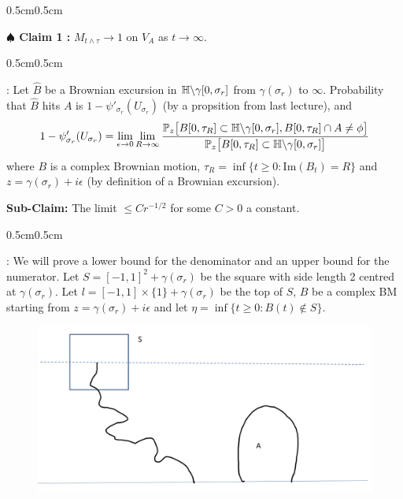 \documentclass[12pt,a4paper]{article}
\newenvironment{proof}
{\begin{changemargin}{0.5cm}{0.5cm} 
	}%
	{\end{changemargin}
}
\newenvironment{subproof}
{\begin{changemargin}{0.5cm}{0.5cm} 
	}%
	{\end{changemargin}
}
\newenvironment{p}
{\begin{proof} 
	}%
	{\end{proof}
}
\begin{document}
\begin{p}
\textbf{$\spadesuit$ Claim 1 :} $M_{t\wedge \tau} \rightarrow 1$ on $V_A$ as $t\rightarrow \infty$.
\begin{subproof}
: Let $\hat{B}$ be a Brownian excursion in $\mathbb{H} \backslash \gamma [0, \sigma_r]$ from $\gamma(\sigma_r)$ to $\infty$. Probability that $\hat{B}$ hits $A$ is $1- \psi'_{\sigma_r}(U_{\sigma_r})$ (by a propsition from last lecture), and
\begin{align*}
1- \psi'_{\sigma_r}(U_{\sigma_r}) = \lim_{\epsilon \rightarrow 0}\lim_{R\rightarrow \infty}\frac{\mathbb{P}_z \big[ B[0, \tau_R] \subset \mathbb{H} \backslash \gamma [0, \sigma_r], B[0, \tau_R] \cap A \neq \phi \big]}{\mathbb{P}_{z}\big[ B[0, \tau_R] \subset \mathbb{H} \backslash \gamma[0, \sigma_r] \big]}
\end{align*}
where $B$ is a complex Brownian motion, $\tau_R =\inf\{t\geq 0: \text{Im}(B_t)=R\}$ and $z= \gamma(\sigma_r) +i\epsilon$ (by definition of a Brownian excursion).
\vspace{5pt}

\textbf{Sub-Claim:} The limit $\leq Cr^{-1/2}$ for some $C>0$ a constant.
\begin{subproof}
: We will prove a lower bound for the denominator and an upper bound for the numerator. Let $S = [-1, 1]^2 + \gamma(\sigma_r)$ be the square with side length 2 centred at $\gamma(\sigma_r)$. Let $l=[-1,1]\times \{1\} + \gamma(\sigma_r)$ be the top of $S$, $B$ be a complex BM starting from $z= \gamma(\sigma_r) + i\epsilon$ and let $\eta =\inf\{ t\geq 0 : B(t) \not\in S\}$.
\begin{figure}[h]
    \begin{center}
    \includegraphics[scale=0.2]{7}
    \end{center}
\end{figure}


\end{subproof}
\end{subproof}
\end{p}
\end{document}

